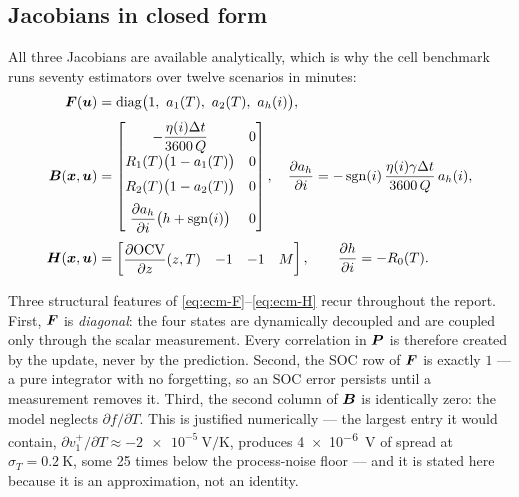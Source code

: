 \subsection{Jacobians in closed form}
All three Jacobians are available analytically, which is why the cell benchmark runs seventy
estimators over twelve scenarios in minutes:
\begin{align}
\bm{F}(\bm{u}) &= \operatorname{diag}\!\big(1,\ a_1(T),\ a_2(T),\ a_h(i)\big),
\label{eq:ecm-F}\\[1mm]
\bm{B}(\bm{x},\bm{u}) &= \begin{bmatrix}
 -\dfrac{\eta(i)\Delta t}{3600\,Q} & 0\\[2mm]
 R_1(T)\big(1-a_1(T)\big) & 0\\[2mm]
 R_2(T)\big(1-a_2(T)\big) & 0\\[2mm]
 \dfrac{\partial a_h}{\partial i}\big(h + \operatorname{sgn}(i)\big) & 0
\end{bmatrix},
\quad
\frac{\partial a_h}{\partial i} = -\operatorname{sgn}(i)\,\frac{\eta(i)\gamma\Delta t}{3600\,Q}\,a_h(i),
\label{eq:ecm-B}\\[1mm]
\bm{H}(\bm{x},\bm{u}) &= \begin{bmatrix}
 \dfrac{\partial\mathrm{OCV}}{\partial z}(z,T) & -1 & -1 & M
\end{bmatrix},
\qquad
\frac{\partial h}{\partial i} = -R_0(T).
\label{eq:ecm-H}
\end{align}

Three structural features of \eqref{eq:ecm-F}--\eqref{eq:ecm-H} recur throughout the report.
First, $\bm{F}$ is \emph{diagonal}: the four states are dynamically decoupled and are coupled only
through the scalar measurement. Every correlation in $\bm{P}$ is therefore created by the update,
never by the prediction. Second, the SOC row of $\bm{F}$ is exactly $1$ --- a pure integrator with
no forgetting, so an SOC error persists until a measurement removes it. Third, the second column
of $\bm{B}$ is identically zero: the model neglects $\partial f/\partial T$. This is justified
numerically --- the largest entry it would contain,
$\partial v_1^+/\partial T \approx \SI{-2e-5}{\volt\per\kelvin}$, produces
\SI{4e-6}{\volt} of spread at $\sigma_T = \SI{0.2}{\kelvin}$, some \num{25} times below the
process-noise floor --- and it is stated here because it is an approximation, not an identity.


